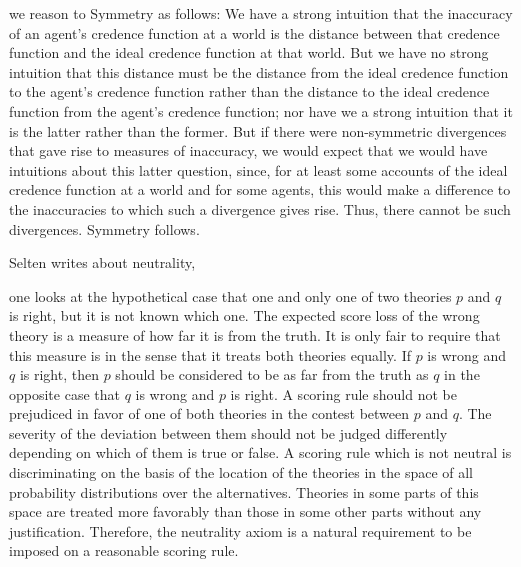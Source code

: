 \documentclass[12pt]{article}
\begin{document}
\begin{quotex}
  we reason to Symmetry as follows: We have a strong intuition that
  the inaccuracy of an agent's credence function at a world is the
  distance between that credence function and the ideal credence
  function at that world. But we have no strong intuition that this
  distance must be the distance from the ideal credence function to
  the agent's credence function rather than the distance to the ideal
  credence function from the agent's credence function; nor have we a
  strong intuition that it is the latter rather than the former. But
  if there were non-symmetric divergences that gave rise to measures
  of inaccuracy, we would expect that we would have intuitions about
  this latter question, since, for at least some accounts of the ideal
  credence function at a world and for some agents, this would make a
  difference to the inaccuracies to which such a divergence gives
  rise. Thus, there cannot be such divergences. Symmetry follows.
\end{quotex}

Selten writes about neutrality,
\begin{quotex}
  one looks at the hypothetical case that one and only one of two
  theories $p$ and $q$ is right, but it is not known which one. The
  expected score loss of the wrong theory is a measure of how far it
  is from the truth. It is only fair to require that this measure is
   in the sense that it treats both theories equally.
  If $p$ is wrong and $q$ is right, then $p$ should be considered to
  be as far from the truth as $q$ in the opposite case that $q$ is
  wrong and $p$ is right. A scoring rule should not be prejudiced in
  favor of one of both theories in the contest between $p$ and $q$.
  The severity of the deviation between them should not be judged
  differently depending on which of them is true or false. A scoring
  rule which is not neutral is discriminating on the basis of the
  location of the theories in the space of all probability
  distributions over the alternatives. Theories in some parts of this
  space are treated more favorably than those in some other parts
  without any justification. Therefore, the neutrality axiom is a
  natural requirement to be imposed on a reasonable scoring rule.
\end{quotex}
\end{document}
